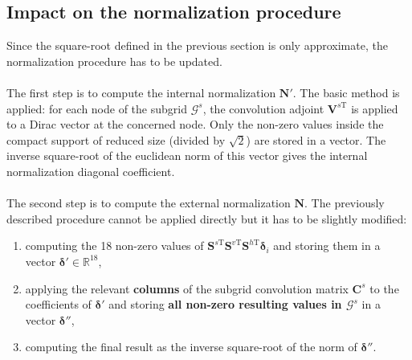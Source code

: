 \documentclass[12pt]{scrartcl}
\begin{document}
\subsection{Impact on the normalization procedure}
Since the square-root defined in the previous section is only approximate, the normalization procedure has to be updated.\\
$  $\\
The first step is to compute the internal normalization $\mathbf{N}'$. The basic method is applied: for each node of the subgrid $\mathcal{G}^s$, the convolution adjoint $\mathbf{V}^{s\textrm{T}}$ is applied to a Dirac vector at the concerned node. Only the non-zero values inside the compact support of reduced size (divided by $\sqrt{2}$) are stored in a vector. The inverse square-root of the euclidean norm of this vector gives the internal normalization diagonal coefficient.\\
$  $\\
The second step is to compute the external normalization $\mathbf{N}$. The previously described procedure cannot be applied directly but it has to be slightly modified:
\begin{enumerate}
\item computing the 18 non-zero values of $\mathbf{S}^{s\textrm{T}} \mathbf{S}^{v\textrm{T}} \mathbf{S}^{h\textrm{T}} \boldsymbol{\delta}_i$ and storing them in a vector $\boldsymbol{\delta}' \in \mathbb{R}^{18}$,
\item applying the relevant \textbf{columns} of the subgrid convolution matrix $\mathbf{C}^s$ to the coefficients of $\boldsymbol{\delta}'$ and storing \textbf{all non-zero resulting values in $\mathcal{G}^s$} in a vector $\boldsymbol{\delta}''$,
\item computing the final result as the inverse square-root of the  norm of $\boldsymbol{\delta}''$.
\end{enumerate}
\end{document}
